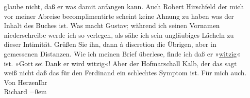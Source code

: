 \begin{ledgroupsized}[t]{13cm}
               glaube nicht, daß er was damit anfangen kann. Auch Robert Hirschfeld der mich vor meiner Abreise becomplimentirte scheint keine
               Ahnung zu haben was der Inhalt des Buches ist. Was macht Gustav; während
               ich seinen Vornamen niederschreibe werde ich so verlegen, als sähe ich sein
               ungläubiges Lächeln zu dieser Intimität. Grüßen Sie ihn, dann à discretion die
               Übrigen, aber in gemessenen Distanzen.\pend
           \pstart
           Wie ich meinen Brief überlese, finde ich daß er »\uline{witzig}« ist. »Gott sei
                  Dank er wird witzig«! Aber der Hofmarschall Kalb, der das sagt weiß nicht daß das für den Ferdinand ein schlechtes
               Symptom ist. Für mich auch.\pend
           \pstart
           Von Herzen\hspace*{1.5em}Ihr{\\[\baselineskip]}\spacefill\mbox{Richard}\pend
           \leftskip=0em{}
         
         \endnumbering{}\end{ledgroupsized}  \newcommand{\dateiname}{L01016}\newcommand{\titel}{Richard Beer-Hofmann an Arthur Schnitzler, 22. 2. 1900}\newcommand{\editorInnen}{Martin Anton Müller und Gerd-Hermann Susen}
      